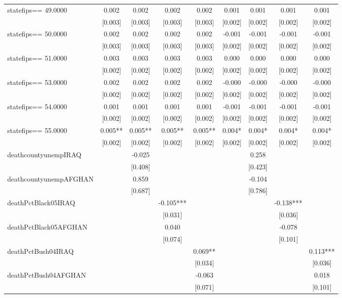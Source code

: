 \documentclass[]{article}
\begin{document}
\begin{tabular}{lcccccccc}
statefips==    49.0000 & 0.002 & 0.002 & 0.002 & 0.002 & 0.001 & 0.001 & 0.001 & 0.001 \\
 & [0.003] & [0.003] & [0.003] & [0.003] & [0.002] & [0.002] & [0.002] & [0.002] \\
statefips==    50.0000 & 0.002 & 0.002 & 0.002 & 0.002 & -0.001 & -0.001 & -0.001 & -0.001 \\
 & [0.003] & [0.003] & [0.003] & [0.003] & [0.002] & [0.002] & [0.002] & [0.002] \\
statefips==    51.0000 & 0.003 & 0.003 & 0.003 & 0.003 & 0.000 & 0.000 & 0.000 & 0.000 \\
 & [0.002] & [0.002] & [0.002] & [0.002] & [0.002] & [0.002] & [0.002] & [0.002] \\
statefips==    53.0000 & 0.002 & 0.002 & 0.002 & 0.002 & -0.000 & -0.000 & -0.000 & -0.000 \\
 & [0.002] & [0.002] & [0.002] & [0.002] & [0.002] & [0.002] & [0.002] & [0.002] \\
statefips==    54.0000 & 0.001 & 0.001 & 0.001 & 0.001 & -0.001 & -0.001 & -0.001 & -0.001 \\
 & [0.002] & [0.002] & [0.002] & [0.002] & [0.002] & [0.002] & [0.002] & [0.002] \\
statefips==    55.0000 & 0.005** & 0.005** & 0.005** & 0.005** & 0.004* & 0.004* & 0.004* & 0.004* \\
 & [0.002] & [0.002] & [0.002] & [0.002] & [0.002] & [0.002] & [0.002] & [0.002] \\
deathcountyunempIRAQ &  & -0.025 &  &  &  & 0.258 &  &  \\
 &  & [0.408] &  &  &  & [0.423] &  &  \\
deathcountyunempAFGHAN &  & 0.859 &  &  &  & -0.104 &  &  \\
 &  & [0.687] &  &  &  & [0.786] &  &  \\
deathPctBlack05IRAQ &  &  & -0.105*** &  &  &  & -0.138*** &  \\
 &  &  & [0.031] &  &  &  & [0.036] &  \\
deathPctBlack05AFGHAN &  &  & 0.040 &  &  &  & -0.078 &  \\
 &  &  & [0.074] &  &  &  & [0.101] &  \\
deathPctBush04IRAQ &  &  &  & 0.069** &  &  &  & 0.113*** \\
 &  &  &  & [0.034] &  &  &  & [0.036] \\
deathPctBush04AFGHAN &  &  &  & -0.063 &  &  &  & 0.018 \\
 &  &  &  & [0.071] &  &  &  & [0.101] \\

\end{tabular}
\end{document}

